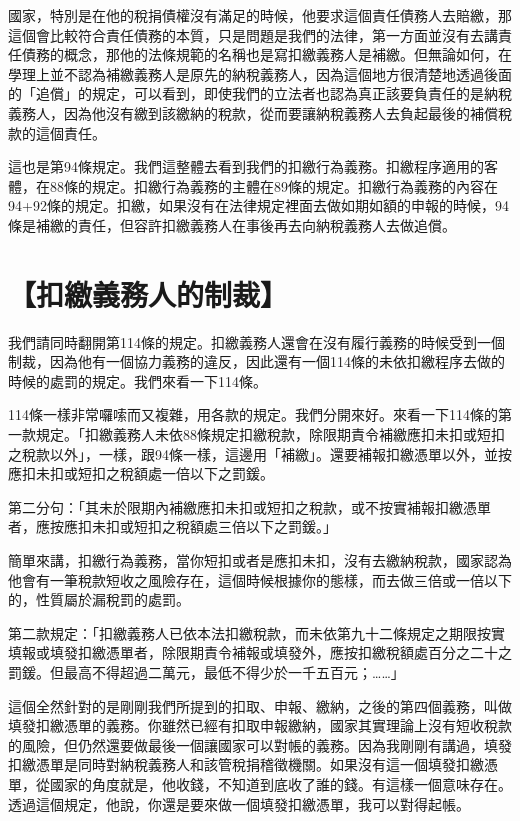 \documentclass[]{ctexbook}
\begin{document}
國家，特別是在他的稅捐債權沒有滿足的時候，他要求這個責任債務人去賠繳，那這個會比較符合責任債務的本質，只是問題是我們的法律，第一方面並沒有去講責任債務的概念，那他的法條規範的名稱也是寫扣繳義務人是補繳。但無論如何，在學理上並不認為補繳義務人是原先的納稅義務人，因為這個地方很清楚地透過後面的「追償」的規定，可以看到，即使我們的立法者也認為真正該要負責任的是納稅義務人，因為他沒有繳到該繳納的稅款，從而要讓納稅義務人去負起最後的補償稅款的這個責任。

這也是第94條規定。我們這整體去看到我們的扣繳行為義務。扣繳程序適用的客體，在88條的規定。扣繳行為義務的主體在89條的規定。扣繳行為義務的內容在94+92條的規定。扣繳，如果沒有在法律規定裡面去做如期如額的申報的時候，94條是補繳的責任，但容許扣繳義務人在事後再去向納稅義務人去做追償。

\hypertarget{ux6263ux7e73ux7fa9ux52d9ux4ebaux7684ux5236ux88c1}{%
\section{【扣繳義務人的制裁】}\label{ux6263ux7e73ux7fa9ux52d9ux4ebaux7684ux5236ux88c1}}

我們請同時翻開第114條的規定。扣繳義務人還會在沒有履行義務的時候受到一個制裁，因為他有一個協力義務的違反，因此還有一個114條的未依扣繳程序去做的時候的處罰的規定。我們來看一下114條。

114條一樣非常囉嗦而又複雜，用各款的規定。我們分開來好。來看一下114條的第一款規定。「扣繳義務人未依88條規定扣繳稅款，除限期責令補繳應扣未扣或短扣之稅款以外」，一樣，跟94條一樣，這邊用「補繳」。還要補報扣繳憑單以外，並按應扣未扣或短扣之稅額處一倍以下之罰鍰。

第二分句：「其未於限期內補繳應扣未扣或短扣之稅款，或不按實補報扣繳憑單者，應按應扣未扣或短扣之稅額處三倍以下之罰鍰。」

簡單來講，扣繳行為義務，當你短扣或者是應扣未扣，沒有去繳納稅款，國家認為他會有一筆稅款短收之風險存在，這個時候根據你的態樣，而去做三倍或一倍以下的，性質屬於漏稅罰的處罰。

第二款規定：「扣繳義務人已依本法扣繳稅款，而未依第九十二條規定之期限按實填報或填發扣繳憑單者，除限期責令補報或填發外，應按扣繳稅額處百分之二十之罰鍰。但最高不得超過二萬元，最低不得少於一千五百元；\ldots\ldots」

這個全然針對的是剛剛我們所提到的扣取、申報、繳納，之後的第四個義務，叫做填發扣繳憑單的義務。你雖然已經有扣取申報繳納，國家其實理論上沒有短收稅款的風險，但仍然還要做最後一個讓國家可以對帳的義務。因為我剛剛有講過，填發扣繳憑單是同時對納稅義務人和該管稅捐稽徵機關。如果沒有這一個填發扣繳憑單，從國家的角度就是，他收錢，不知道到底收了誰的錢。有這樣一個意味存在。透過這個規定，他說，你還是要來做一個填發扣繳憑單，我可以對得起帳。
\end{document}
